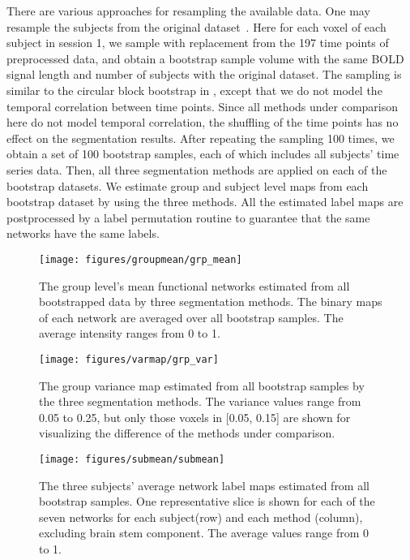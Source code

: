 \documentclass[review,authoryear]{elsarticle}
\begin{document}
There are various approaches for resampling the available data. One may resample
the subjects from the original dataset~\citep{damoiseaux2006consistent}. Here
for each voxel of each subject in session 1, we sample with replacement from the
197 time points of preprocessed data, and obtain a bootstrap sample volume with
the same BOLD signal length and number of subjects with the original
dataset. The sampling is similar to the circular block bootstrap  in
\cite{bellec2010multi}, except that we do not model the temporal correlation
between time points. Since all methods under comparison here do not model
temporal correlation, the shuffling of the time points has no effect on the
segmentation results.  After repeating the sampling 100 times, we obtain a set
of 100 bootstrap samples, each of which includes all subjects' time series
data. Then, all three segmentation methods are applied on each of the bootstrap
datasets. We estimate group and subject level maps from each bootstrap dataset
by using the three methods. All the estimated label maps are postprocessed by a
label permutation routine to guarantee that the same networks have the same
labels.

\begin{figure*}[htb]
  \centering
  \texttt{[image: figures/groupmean/grp\_mean]}
  \caption{The group level's mean functional networks estimated from all
    bootstrapped data by three segmentation methods. The binary maps of each
    network are averaged over all bootstrap samples. The average intensity ranges
    from 0 to 1.}
  \label{fig:grpmean}
\end{figure*}

\begin{figure*}[htb]
  \centering
  \texttt{[image: figures/varmap/grp\_var]}
  \caption{The group variance map estimated from all bootstrap samples by the
    three segmentation methods. The variance values range from 0.05 to 0.25, but
    only those voxels in [0.05, 0.15] are shown for visualizing the difference
    of the methods under comparison.  }
  \label{fig:grpvar}
\end{figure*}

\begin{figure*}[htb]
  \centering
  \texttt{[image: figures/submean/submean]}
  \caption{The three subjects' average network label maps estimated from all
    bootstrap samples. One representative slice is shown for each of the seven
    networks for each subject(row) and each method (column), excluding brain
    stem component. The average values range from 0 to 1. }
  \label{fig:submean}
\end{figure*}
\end{document}
